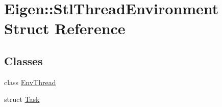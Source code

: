 \hypertarget{struct_eigen_1_1_stl_thread_environment}{}\section{Eigen\+:\+:Stl\+Thread\+Environment Struct Reference}
\label{struct_eigen_1_1_stl_thread_environment}
\subsection*{Classes}
\begin{DoxyCompactItemize}
\item 
class \hyperlink{class_eigen_1_1_stl_thread_environment_1_1_env_thread}{Env\+Thread}
\item 
struct \hyperlink{struct_eigen_1_1_stl_thread_environment_1_1_task}{Task}
\end{DoxyCompactItemize}
